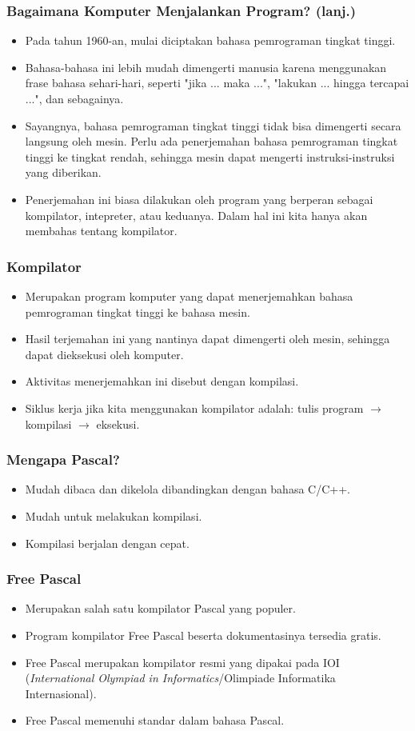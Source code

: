 \documentclass{beamer}
\begin{document}
\begin{frame}
\frametitle{Bagaimana Komputer Menjalankan Program? (lanj.)}
\begin{itemize}
	\item Pada tahun 1960-an, mulai diciptakan bahasa pemrograman tingkat tinggi.
	\item Bahasa-bahasa ini lebih mudah dimengerti manusia karena menggunakan frase bahasa sehari-hari, seperti "jika ... maka ...", "lakukan ... hingga tercapai ...", dan sebagainya.
	\item Sayangnya, bahasa pemrograman tingkat tinggi tidak bisa dimengerti secara langsung oleh mesin. Perlu ada penerjemahan bahasa pemrograman tingkat tinggi ke tingkat rendah, sehingga mesin dapat mengerti instruksi-instruksi yang diberikan.
	\item Penerjemahan ini biasa dilakukan oleh program yang berperan sebagai kompilator, intepreter, atau keduanya. Dalam hal ini kita hanya akan membahas tentang kompilator.
\end{itemize}
\end{frame}

\begin{frame}
\frametitle{Kompilator}
\begin{itemize}
	\item Merupakan program komputer yang dapat menerjemahkan bahasa pemrograman tingkat tinggi ke bahasa mesin.
	\item Hasil terjemahan ini yang nantinya dapat dimengerti oleh mesin, sehingga dapat dieksekusi oleh komputer.
	\item Aktivitas menerjemahkan ini disebut dengan kompilasi.
	\item Siklus kerja jika kita menggunakan kompilator adalah: tulis program $\rightarrow$ kompilasi $\rightarrow$ eksekusi.
\end{itemize}
\end{frame}

\begin{frame}
\frametitle{Mengapa Pascal?}
\begin{itemize}
	\item Mudah dibaca dan dikelola dibandingkan dengan bahasa C/C++.
	\item Mudah untuk melakukan kompilasi.
	\item Kompilasi berjalan dengan cepat.
\end{itemize}
\end{frame}

\begin{frame}
\frametitle{Free Pascal}
\begin{itemize}
	\item Merupakan salah satu kompilator Pascal yang populer.
	\item Program kompilator Free Pascal beserta dokumentasinya tersedia gratis.
	\item Free Pascal merupakan kompilator resmi yang dipakai pada IOI (\textit{International Olympiad in Informatics}/Olimpiade Informatika Internasional).
	\item Free Pascal memenuhi standar dalam bahasa Pascal.
\end{itemize}
\end{frame}
\end{document}
